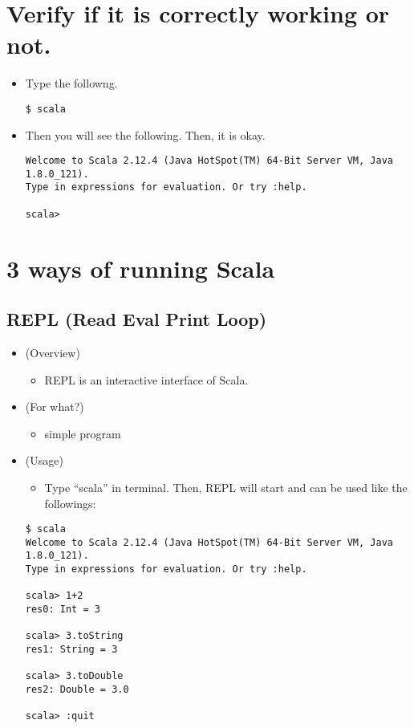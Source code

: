 \documentclass[11pt]{article}
\begin{document}
\section*{Verify if it is correctly working or not.}
\label{sec:orgheadline6}
\begin{itemize}
\item Type the followng.
\begin{verbatim}
$ scala
\end{verbatim}
\item Then you will see the following. Then, it is okay.
\begin{verbatim}
Welcome to Scala 2.12.4 (Java HotSpot(TM) 64-Bit Server VM, Java 1.8.0_121).
Type in expressions for evaluation. Or try :help.

scala>
\end{verbatim}
\end{itemize}


\section*{3 ways of running Scala}
\label{sec:orgheadline10}
\subsection*{REPL (Read Eval Print Loop)}
\label{sec:orgheadline7}
\begin{itemize}
\item (Overview)
\begin{itemize}
\item REPL is an interactive interface of Scala.
\end{itemize}
\item (For what?)
\begin{itemize}
\item simple program
\end{itemize}
\item (Usage)
\begin{itemize}
\item Type ``scala'' in terminal. Then, REPL will start and can be
used like the followings:
\end{itemize}
\begin{verbatim}
$ scala
Welcome to Scala 2.12.4 (Java HotSpot(TM) 64-Bit Server VM, Java 1.8.0_121).
Type in expressions for evaluation. Or try :help.

scala> 1+2
res0: Int = 3

scala> 3.toString
res1: String = 3

scala> 3.toDouble
res2: Double = 3.0

scala> :quit
\end{verbatim}
\end{itemize}
\end{document}
